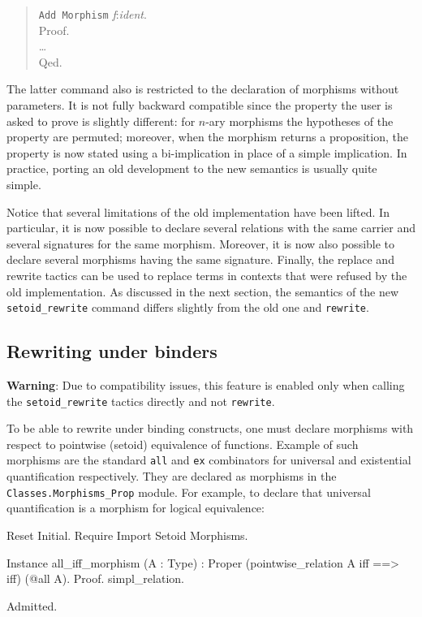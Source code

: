 \begin{quote}
  \texttt{Add Morphism} \textit{f}:\textit{ident}.\\
  Proof.\\
  \ldots\\
  Qed.
\end{quote}

The latter command also is restricted to the declaration of morphisms without
parameters. It is not fully backward compatible since the property the user
is asked to prove is slightly different: for $n$-ary morphisms the hypotheses
of the property are permuted; moreover, when the morphism returns a
proposition, the property is now stated using a bi-implication in place of
a simple implication. In practice, porting an old development to the new
semantics is usually quite simple.

Notice that several limitations of the old implementation have been lifted.
In particular, it is now possible to declare several relations with the
same carrier and several signatures for the same morphism. Moreover, it is
now also possible to declare several morphisms having the same signature.
Finally, the replace and rewrite tactics can be used to replace terms in
contexts that were refused by the old implementation. As discussed in
the next section, the semantics of the new \texttt{setoid\_rewrite}
command differs slightly from the old one and \texttt{rewrite}.

\subsection{Rewriting under binders}

\textbf{Warning}: Due to compatibility issues, this feature is enabled only when calling 
the \texttt{setoid\_rewrite} tactics directly and not \texttt{rewrite}.

To be able to rewrite under binding constructs, one must declare
morphisms with respect to pointwise (setoid) equivalence of functions. 
Example of such morphisms are the standard \texttt{all} and \texttt{ex}
combinators for universal and existential quantification respectively. 
They are declared as morphisms in the \texttt{Classes.Morphisms\_Prop}
module. For example, to declare that universal quantification is a
morphism for logical equivalence:

\begin{coq_eval}
Reset Initial.
Require Import Setoid Morphisms.
\end{coq_eval}
\begin{coq_example}
Instance all_iff_morphism (A : Type) :
  Proper (pointwise_relation A iff ==> iff) (@all A).
Proof. simpl_relation. 
\end{coq_example}
\begin{coq_eval}
Admitted.
\end{coq_eval}

